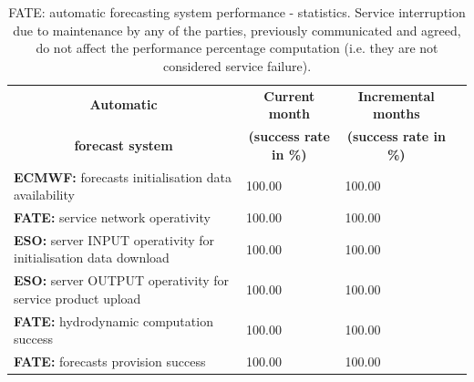 \begin{table}[]
\begin{center}
\begin{tabular}{|l|l|l|l|}
\hline
\multicolumn{1}{|c|}{\cellcolor[HTML]{C0C0C0}\textbf{Automatic}} & \multicolumn{1}{c|}{\cellcolor[HTML]{C0C0C0}\textbf{Current month}} & \multicolumn{1}{c|}{\cellcolor[HTML]{C0C0C0}\textbf{Incremental months}} \\
\multicolumn{1}{|c|}{\cellcolor[HTML]{C0C0C0}\textbf{forecast system}} & \multicolumn{1}{c|}{\cellcolor[HTML]{C0C0C0}\textbf{(success rate in \%)}} & \multicolumn{1}{c|}{\cellcolor[HTML]{C0C0C0}\textbf{(success rate in \%)}} \\
\hline
\cellcolor[HTML]{C0C0C0}\textbf{ECMWF:} forecasts initialisation data availability  & 100.00  & 100.00   \\
\cellcolor[HTML]{C0C0C0}\textbf{FATE:}  service network operativity                                    & 100.00  & 100.00   \\
\cellcolor[HTML]{C0C0C0}\textbf{ESO:} server INPUT operativity for initialisation data download                                & 100.00  & 100.00   \\
\cellcolor[HTML]{C0C0C0}\textbf{ESO:} server OUTPUT operativity for service product upload                               & 100.00  & 100.00   \\
\cellcolor[HTML]{C0C0C0}\textbf{FATE:} hydrodynamic computation success           & 100.00  & 100.00   \\
\cellcolor[HTML]{C0C0C0}\textbf{FATE:} forecasts provision success             & 100.00  & 100.00   \\
\hline
\end{tabular}
\caption{FATE: automatic forecasting system performance - statistics. Service interruption due to maintenance by any of the parties, previously communicated and agreed, do not affect the performance percentage computation (i.e. they are not considered service failure).}\label{tab:LOGs}
\end{center}
\end{table}
